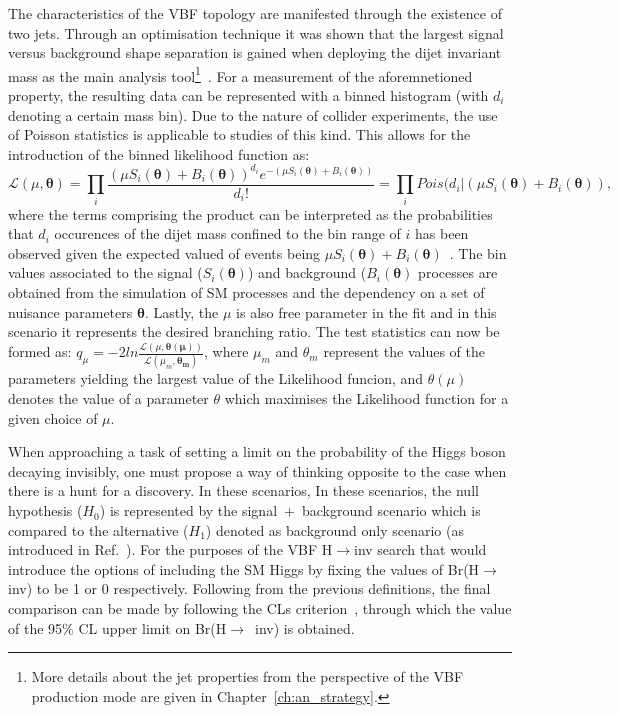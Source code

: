 \hspace{10pt} The characteristics of the VBF topology are manifested through the existence of two jets. Through an optimisation technique it was shown that the largest signal versus background shape separation is gained when deploying the dijet invariant mass as the main analysis tool\footnote{More details about the jet properties from the perspective of the VBF production mode are given in Chapter~\ref{ch:an_strategy}.}~\cite{paper:HIG_17_023,Riccardo}. For a measurement of the aforemnetioned property, the resulting data can be represented with a binned histogram (with $d_i$ denoting a certain mass bin). Due to the nature of collider experiments, the use of Poisson statistics is applicable to studies of this kind. This allows for the introduction of the binned likelihood function as:
\begin{equation}
    \mathcal{L}(\mu, \boldsymbol{\theta}) = \prod_i \frac{(\mu S_i(\boldsymbol{\theta})+B_i(\boldsymbol{\theta}))^{d_i}e^{-(\mu S_i(\boldsymbol{\theta})+B_i(\boldsymbol{\theta}))}}{d_i!} = \prod_i Pois(d_i|(\mu S_i(\boldsymbol{\theta})+B_i(\boldsymbol{\theta})),
\end{equation}
where the terms comprising the product can be interpreted as the probabilities that $d_i$ occurences of the dijet mass confined to the bin range of $i$ has been observed given the expected valued of events being $\mu S_i(\boldsymbol{\theta})+B_i(\boldsymbol{\theta})$~\cite{paper:stat_overview,paper:cls_intro}. The bin values associated to the signal ($S_i(\boldsymbol{\theta})$) and background ($B_i(\boldsymbol{\theta})$ processes are obtained from the simulation of SM processes and the dependency on a set of nuisance parameters $\boldsymbol{\theta}$. Lastly, the $\mu$  is also free parameter in the fit and in this scenario it represents the desired branching ratio. The test statistics can now be formed as: $q_\mu = -2ln\frac{\mathcal{L}(\mu, \boldsymbol{\theta(\mu)})}{\mathcal{L}(\mu_m, \boldsymbol{\theta_m})}$, where $\mu_m$ and $\theta_m$ represent the values of the parameters yielding the largest value of the Likelihood funcion, and $\theta(\mu)$ denotes the value of a parameter $\theta$ which maximises the Likelihood function for a given choice of $\mu$. 

\hspace{10pt} When approaching a task of setting a limit on the probability of the Higgs boson decaying invisibly, one must propose a way of thinking opposite to the case when there is a hunt for a discovery. In these scenarios, In these scenarios, the null hypothesis ($H_0$) is represented by the signal~$+$~background scenario which is compared to the alternative ($H_1$) denoted as background only scenario (as introduced in Ref.~\cite{paper:stat_overview}). For the purposes of the VBF H$\rightarrow$inv search that would introduce the options of including the SM Higgs by fixing the values of Br(H$\rightarrow$inv) to be 1 or 0 respectively. Following from the previous definitions, the final comparison can be made by following the CLs criterion~\cite{paper:stat_overview,paper:cls_intro}, through which the value of the 95\% CL upper limit on Br(H$\rightarrow$~inv) is obtained.

